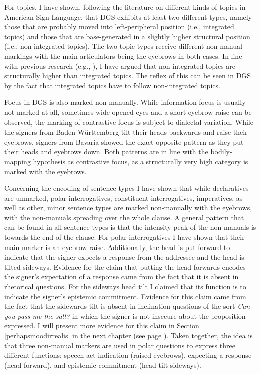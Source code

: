 For topics, I have shown, following the literature on different kinds of topics in American Sign Language, that DGS exhibits at least two different types, namely those that are probably moved into left-peripheral position (i.e., integrated topics) and those that are base-generated in a slightly higher structural position (i.e., non-integrated topics). The two topic types receive different non-manual markings with the main articulators being the eyebrows in both cases. In line with previous research (e.g., \citealt{benincapol2004topic}), I have argued that non-integrated topics are structurally higher than integrated topics. The reflex of this can be seen in DGS by the fact that integrated topics have to follow non-integrated topics.

Focus in DGS is also marked non-manually. While information focus is usually not marked at all, sometimes wide-opened eyes and a short eyebrow raise can be observed, the marking of contrastive focus is subject to dialectal variation. While the signers from Baden-Württemberg tilt their heads backwards and raise their eyebrows, signers from Bavaria showed the exact opposite pattern as they put their heads and eyebrows down. Both patterns are in line with the bodily-mapping hypothesis as contrastive focus, as a structurally very high category is marked with the eyebrows. 

Concerning the encoding of sentence types I have shown that while declaratives are unmarked, polar interrogatives, constituent interrogatives, imperatives, as well as other, minor sentence types are marked non-manually with the eyebrows, with the non-manuals spreading over the whole clause. A general pattern that can be found in all sentence types is that the intensity peak of the non-manuals is towards the end of the clause. For polar interrogatives I have shown that their main marker is an eyebrow raise. Additionally, the head is put forward to indicate that the signer expects a response from the addressee and the head is tilted sideways. Evidence for the claim that putting the head forwards encodes the signer's expectation of a response came from the fact that it is absent in rhetorical questions. For the sideways head tilt I claimed that its function is to indicate the signer's epistemic commitment. Evidence for this claim came from the fact that the sidewards tilt is absent in inclination questions of the sort \textit{Can you pass me the salt?} in which the signer is not insecure about the proposition expressed. I will present more evidence for this claim in Section \ref{perhapsmoodirrealis} in the next chapter (see page \pageref{perhapsmoodirrealis}). Taken together, the idea is that three non-manual markers are used in polar questions to express three different functions: speech-act indication (raised eyebrows), expecting a response (head forward), and epistemic commitment (head tilt sideways). 


